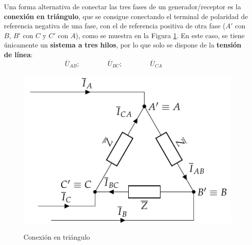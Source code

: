 Una forma alternativa de conectar las tres fases de un
generador/receptor es la \textbf{conexión en triángulo}, que se
consigue conectando el terminal de polaridad de referencia negativa de
una fase, con el de referencia positiva de otra fase ($A'$ con $B$,
$B'$ con $C$ y $C'$ con $A$), como se muestra en la Figura
\ref{fig.conexion_triangulo}. En este caso, se tiene únicamente un
\textbf{sistema a tres hilos}, por lo que solo se dispone de la
\textbf{tensión de línea}:
\begin{equation*}
  \overline{U}_{AB};\qquad\qquad \overline{U}_{BC};\qquad\qquad \overline{U}_{CA}\qquad\qquad
\end{equation*}
\begin{figure}[H]
  \centering
  {\includegraphics{../figs/TrianguloEquilibrado_Receptor.pdf}}
  \caption{Conexión en triángulo}
  \label{fig.conexion_triangulo}
\end{figure}
	
